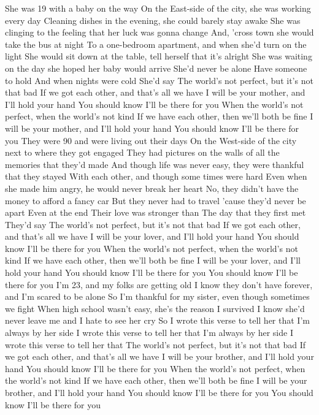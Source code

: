 \documentclass[
  letterpaper,
  DIV=11,
  numbers=noendperiod]{scrreprt}
\begin{document}
She was 19 with a baby on the way On the East-side of the city, she was
working every day Cleaning dishes in the evening, she could barely stay
awake She was clinging to the feeling that her luck was gonna change
And, 'cross town she would take the bus at night To a one-bedroom
apartment, and when she'd turn on the light She would sit down at the
table, tell herself that it's alright She was waiting on the day she
hoped her baby would arrive She'd never be alone Have someone to hold
And when nights were cold She'd say The world's not perfect, but it's
not that bad If we got each other, and that's all we have I will be your
mother, and I'll hold your hand You should know I'll be there for you
When the world's not perfect, when the world's not kind If we have each
other, then we'll both be fine I will be your mother, and I'll hold your
hand You should know I'll be there for you They were 90 and were living
out their days On the West-side of the city next to where they got
engaged They had pictures on the walls of all the memories that they'd
made And though life was never easy, they were thankful that they stayed
With each other, and though some times were hard Even when she made him
angry, he would never break her heart No, they didn't have the money to
afford a fancy car But they never had to travel 'cause they'd never be
apart Even at the end Their love was stronger than The day that they
first met They'd say The world's not perfect, but it's not that bad If
we got each other, and that's all we have I will be your lover, and I'll
hold your hand You should know I'll be there for you When the world's
not perfect, when the world's not kind If we have each other, then we'll
both be fine I will be your lover, and I'll hold your hand You should
know I'll be there for you You should know I'll be there for you I'm 23,
and my folks are getting old I know they don't have forever, and I'm
scared to be alone So I'm thankful for my sister, even though sometimes
we fight When high school wasn't easy, she's the reason I survived I
know she'd never leave me and I hate to see her cry So I wrote this
verse to tell her that I'm always by her side I wrote this verse to tell
her that I'm always by her side I wrote this verse to tell her that The
world's not perfect, but it's not that bad If we got each other, and
that's all we have I will be your brother, and I'll hold your hand You
should know I'll be there for you When the world's not perfect, when the
world's not kind If we have each other, then we'll both be fine I will
be your brother, and I'll hold your hand You should know I'll be there
for you You should know I'll be there for you
\end{document}

